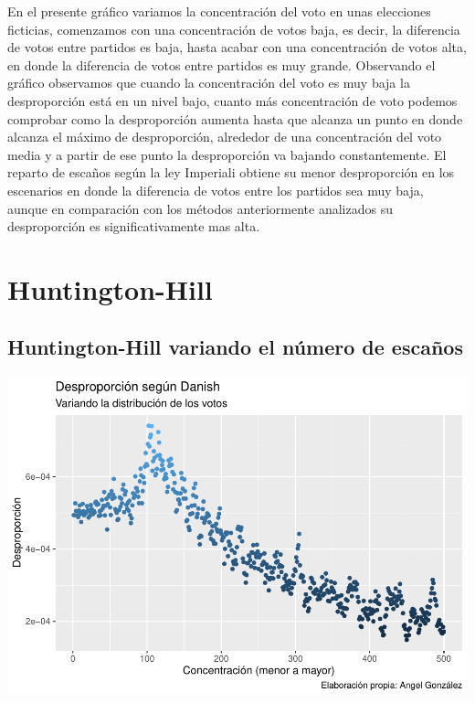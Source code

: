 \documentclass[12pt,a4paper,]{book}
\numberwithin{dummy}{section}
\theoremstyle{ocrenumbox}
\theoremstyle{blacknumex}
\theoremstyle{blacknumbox}
\theoremstyle{ocrenum}
\theoremstyle{ocrenum}
\begin{document}
En el presente gráfico variamos la concentración del voto en unas
elecciones ficticias, comenzamos con una concentración de votos baja, es
decir, la diferencia de votos entre partidos es baja, hasta acabar con
una concentración de votos alta, en donde la diferencia de votos entre
partidos es muy grande. Observando el gráfico observamos que cuando la
concentración del voto es muy baja la desproporción está en un nivel
bajo, cuanto más concentración de voto podemos comprobar como la
desproporción aumenta hasta que alcanza un punto en donde alcanza el
máximo de desproporción, alrededor de una concentración del voto media y
a partir de ese punto la desproporción va bajando constantemente. El
reparto de escaños según la ley Imperiali obtiene su menor desproporción
en los escenarios en donde la diferencia de votos entre los partidos sea
muy baja, aunque en comparación con los métodos anteriormente analizados
su desproporción es significativamente mas alta.

\hypertarget{huntington-hill}{%
\section{Huntington-Hill}\label{huntington-hill}}

\hypertarget{huntington-hill-variando-el-nuxfamero-de-escauxf1os}{%
\subsection{Huntington-Hill variando el número de
escaños}\label{huntington-hill-variando-el-nuxfamero-de-escauxf1os}}

\begin{center}\includegraphics[width=0.95\linewidth]{figurasR/unnamed-chunk-38-1} \end{center}
\end{document}
